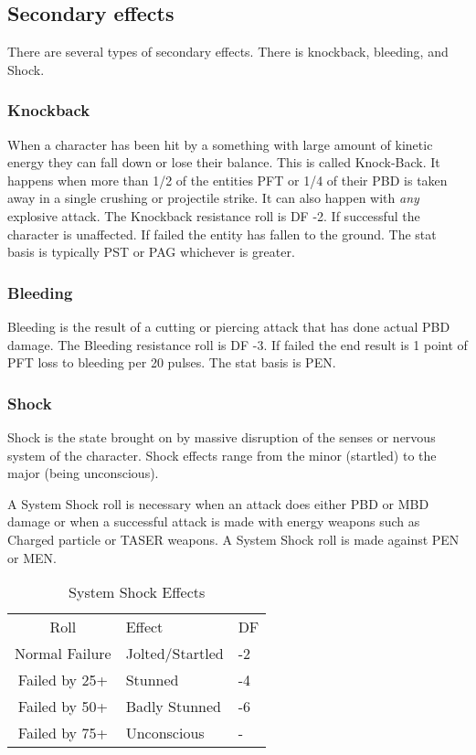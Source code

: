 \subsection{Secondary effects}

There are several types of secondary effects. There is knockback,
bleeding, and Shock.

\subsubsection{{Knockback}}

When a character has been hit by a something with large amount of kinetic
energy they can fall down or lose their balance. This is called Knock-Back.
It happens when more than 1/2 of the entities PFT or 1/4 of their PBD is taken
away in a single crushing or projectile strike. It can also happen with {\em any}
explosive attack. The Knockback resistance roll is DF -2. If successful the
character is unaffected. If failed the entity has fallen to the ground.
The stat basis is typically PST or PAG whichever is greater.

\subsubsection{{Bleeding}}
Bleeding is the result of a cutting or piercing attack that has done
actual PBD damage. The Bleeding resistance roll is DF -3. If failed the
end result is 1 point of PFT loss to bleeding per 20 pulses. The stat
basis is PEN.

\subsubsection{{Shock}}

Shock is the state brought on by massive disruption of the senses or
nervous system of the character. Shock effects range from the minor
(startled) to the major (being unconscious).

A System Shock roll is necessary when an attack does
either PBD or MBD damage or when a successful attack is made with
energy weapons such as Charged particle or TASER weapons.
A System Shock roll is made against PEN or MEN.


\begin{table}
	\begin{tabular}{cll}
	Roll			  & Effect & DF \\
	Normal Failure	  & Jolted/Startled & -2  \\
	Failed by 25+	   & Stunned & -4  \\
	Failed by 50+	   & Badly Stunned & -6 \\
    Failed by 75+     & Unconscious & - \\
	\end{tabular}
    \caption{System Shock Effects}
\end{table}

